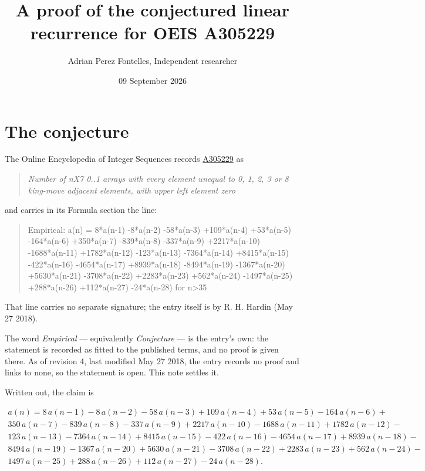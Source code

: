 \documentclass[11pt]{article}
\title{A proof of the conjectured linear recurrence for OEIS A305229}
\author{Adrian Perez Fontelles, Independent researcher}
\date{09 September 2026}
\theoremstyle{definition}
\begin{document}
\maketitle
\section{The conjecture}

The Online Encyclopedia of Integer Sequences records \href{https://oeis.org/A305229}{A305229} as

\begin{quote}\itshape Number of nX7 0..1 arrays with every element unequal to 0, 1, 2, 3 or 8 king-move adjacent elements, with upper left element zero\end{quote}

and carries in its Formula section the line:

\begin{quote}\ttfamily Empirical: a(n) = 8*a(n-1) -8*a(n-2) -58*a(n-3) +109*a(n-4) +53*a(n-5) -164*a(n-6) +350*a(n-7) -839*a(n-8) -337*a(n-9) +2217*a(n-10) -1688*a(n-11) +1782*a(n-12) -123*a(n-13) -7364*a(n-14) +8415*a(n-15) -422*a(n-16) -4654*a(n-17) +8939*a(n-18) -8494*a(n-19) -1367*a(n-20) +5630*a(n-21) -3708*a(n-22) +2283*a(n-23) +562*a(n-24) -1497*a(n-25) +288*a(n-26) +112*a(n-27) -24*a(n-28) for n>35\end{quote}

That line carries no separate signature; the entry itself is by R. H. Hardin (May 27 2018).

The word {\itshape Empirical} --- equivalently {\itshape Conjecture} --- is the entry's own: the statement is recorded as fitted to the published terms, and no proof is given there. As of revision 4, last modified May 27 2018, the entry records no proof and links to none, so the statement is open. This note settles it.

Written out, the claim is

\begin{multline*} a(n) = 8\,a(n-1) - 8\,a(n-2) - 58\,a(n-3) + 109\,a(n-4) + 53\,a(n-5) - 164\,a(n-6) + \\ 350\,a(n-7) - 839\,a(n-8) - 337\,a(n-9) + 2217\,a(n-10) - 1688\,a(n-11) + 1782\,a(n-12) - \\ 123\,a(n-13) - 7364\,a(n-14) + 8415\,a(n-15) - 422\,a(n-16) - 4654\,a(n-17) + 8939\,a(n-18) - \\ 8494\,a(n-19) - 1367\,a(n-20) + 5630\,a(n-21) - 3708\,a(n-22) + 2283\,a(n-23) + 562\,a(n-24) - \\ 1497\,a(n-25) + 288\,a(n-26) + 112\,a(n-27) - 24\,a(n-28). \end{multline*}
\end{document}
